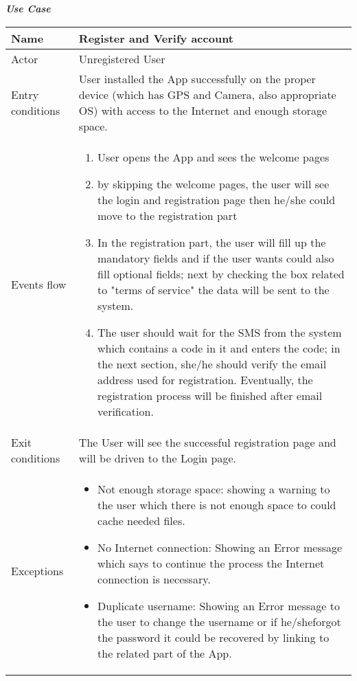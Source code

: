 \begin{table}[H]
\begin{flushleft}\emph{\textbf{Use Case}}\end{flushleft}
\footnotesize
\centering
\settowidth{}
\setlength\extrarowheight{2pt}
\begin{tabulary}{\textwidth}{|J|J|}
\hline
Name             & Register and Verify account \\
\hline 
Actor            & Unregistered User \\
\hline 
Entry conditions & User installed the App successfully on the proper device (which has GPS and Camera, also appropriate OS) with access to the Internet and enough storage space.\\
\hline 
Events flow      & 
\begin{minipage}[t]{0.6\textwidth}
\begin{enumerate} 
\item User opens the App and sees the welcome pages 
\item by skipping the welcome pages, the user will see the login and registration page then he/she could move to the registration part
\item In the registration part, the user will fill up the mandatory fields and if the user wants could also   fill optional fields; next by checking the box related to "terms of service" the data will be sent to the system.
\item The user should wait for the SMS from the system which contains a code in it and enters the code; in the next section, she/he should verify the email address used for registration. Eventually, the registration process will be finished after email verification.
\end{enumerate}
\end{minipage}\\
\hline
Exit conditions  & The User will see the successful registration page and will be driven to the Login page.\\
\hline
Exceptions       & 
\begin{minipage}[t]{0.6\textwidth}
\begin{itemize} 
\item Not enough storage space: showing a warning to the user which there is not enough space to could cache  needed files.
\item No Internet connection: Showing an Error message which says to continue the process the Internet   connection is necessary.
\item Duplicate username: Showing an Error message to the user to change the username or if he/sheforgot the password it could be recovered by linking to the related part of the App.

\end{itemize}
\end{minipage}
\end{tabulary}
\end{table}
